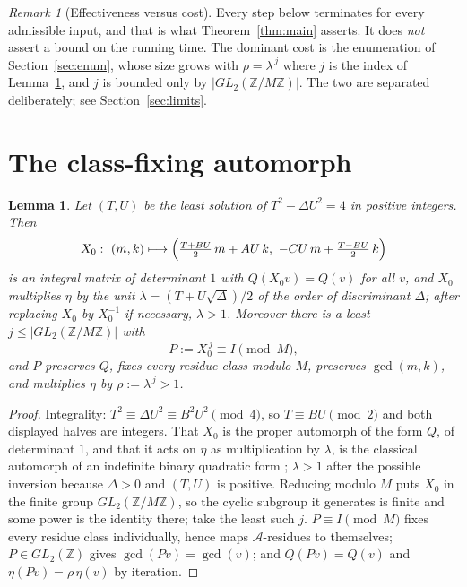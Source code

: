 \documentclass[11pt]{article}
\newtheorem{lemma}[theorem]{Lemma}
\theoremstyle{definition}
\theoremstyle{remark}
\newtheorem{remark}[theorem]{Remark}
\newcommand{\Z}{\mathbb{Z}}
\newcommand{\adm}{\mathcal{A}}
\begin{document}
\begin{remark}[Effectiveness versus cost]\label{rem:cost}
Every step below terminates for every admissible input, and that is what Theorem~\ref{thm:main}
asserts. It does \emph{not} assert a bound on the running time. The dominant cost is the
enumeration of Section~\ref{sec:enum}, whose size grows with $\rho=\lambda^{\,j}$ where $j$ is
the index of Lemma~\ref{lem:automorph}, and $j$ is bounded only by $|GL_2(\Z/M\Z)|$. The two
are separated deliberately; see Section~\ref{sec:limits}.
\end{remark}

\section{The class-fixing automorph}\label{sec:automorph}

\begin{lemma}\label{lem:automorph}
Let $(T,U)$ be the least solution of $T^2-\Delta U^2=4$ in positive integers. Then
\[
X_0:\ (m,k)\longmapsto
\Bigl(\tfrac{T+BU}{2}\,m+AU\,k,\ -CU\,m+\tfrac{T-BU}{2}\,k\Bigr)
\]
is an integral matrix of determinant $1$ with $Q(X_0v)=Q(v)$ for all $v$, and $X_0$ multiplies
$\eta$ by the unit $\lambda=(T+U\sqrt\Delta)/2$ of the order of discriminant $\Delta$; after
replacing $X_0$ by $X_0^{-1}$ if necessary, $\lambda>1$. Moreover there is a least
$j\le|GL_2(\Z/M\Z)|$ with
\[
P:=X_0^{\,j}\equiv I \pmod M,
\]
and $P$ preserves $Q$, fixes every residue class modulo $M$, preserves $\gcd(m,k)$, and
multiplies $\eta$ by $\rho:=\lambda^{\,j}>1$.
\end{lemma}

\begin{proof}
Integrality: $T^2\equiv\Delta U^2\equiv B^2U^2\pmod4$, so $T\equiv BU\pmod2$ and both displayed
halves are integers. That $X_0$ is the proper automorph of the form $Q$, of determinant $1$, and
that it acts on $\eta$ as multiplication by $\lambda$, is the classical automorph of an
indefinite binary quadratic form \cite{BuellBQF,ConradGenPell}; $\lambda>1$ after the possible
inversion because $\Delta>0$ and $(T,U)$ is positive. Reducing modulo $M$ puts $X_0$ in the
finite group $GL_2(\Z/M\Z)$, so the cyclic subgroup it generates is finite and some power is the
identity there; take the least such $j$. $P\equiv I\pmod M$ fixes every residue class
individually, hence maps $\adm$-residues to themselves; $P\in GL_2(\Z)$ gives
$\gcd(Pv)=\gcd(v)$; and $Q(Pv)=Q(v)$ and $\eta(Pv)=\rho\,\eta(v)$ by iteration.
\end{proof}
\end{document}
